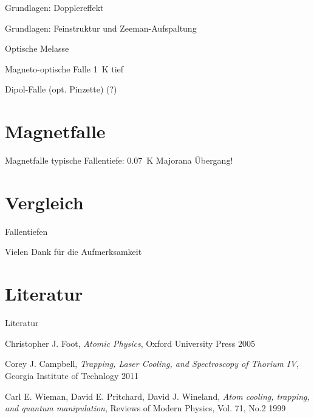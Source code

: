 \documentclass[12pt]{beamer}
\begin{document}
\begin{frame}{Grundlagen: Dopplereffekt}
\end{frame}

\begin{frame}{Grundlagen: Feinstruktur und Zeeman-Aufspaltung}
\end{frame}

\begin{frame}{Optische Melasse}
\end{frame}

\begin{frame}{Magneto-optische Falle}
\SI{1}{K} tief
\end{frame}

\begin{frame}{Dipol-Falle (opt. Pinzette) (?)}
\end{frame}


\section{Magnetfalle}

\begin{frame}{Magnetfalle}
typische Fallentiefe: \SI{0.07}{\kelvin}
Majorana Übergang!
\end{frame}


\section{Vergleich}

\begin{frame}{Fallentiefen}
\end{frame}

\begin{frame}{Vielen Dank für die Aufmerksamkeit}
\end{frame}

\section{Literatur}

\begin{frame}{Literatur}
	\begin{thebibliography}{9}
		Christopher J. Foot,
		\emph{Atomic Physics},
		Oxford University Press 2005
		
		Corey J. Campbell,
		\emph{Trapping, Laser Cooling, and Spectroscopy of Thorium IV},
		Georgia Institute of Technlogy 2011
		
		Carl E. Wieman, David E. Pritchard, David J. Wineland,
		\emph{Atom cooling, trapping, and quantum manipulation},
		Reviews of Modern Physics, Vol. 71, No.2 1999
		
	\end{thebibliography}
	
\end{frame}
\end{document}
